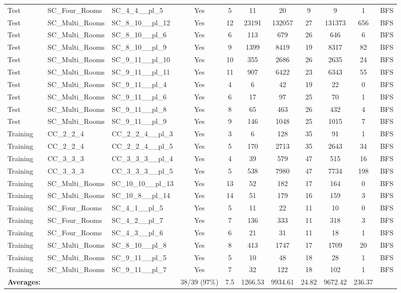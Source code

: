 \documentclass{article}
\begin{document}
\begin{tabular}{lllcccccccc}
Test & SC\_Four\_Rooms & SC\_4\_4\_\_pl\_5 & Yes & 5 & 11 & 20 & 9 & 9 & 1 & BFS \\
Test & SC\_Multi\_Rooms & SC\_8\_10\_\_pl\_12 & Yes & 12 & 23191 & 132057 & 27 & 131373 & 656 & BFS \\
Test & SC\_Multi\_Rooms & SC\_8\_10\_\_pl\_6 & Yes & 6 & 113 & 679 & 26 & 646 & 6 & BFS \\
Test & SC\_Multi\_Rooms & SC\_8\_10\_\_pl\_9 & Yes & 9 & 1399 & 8419 & 19 & 8317 & 82 & BFS \\
Test & SC\_Multi\_Rooms & SC\_9\_11\_\_pl\_10 & Yes & 10 & 355 & 2686 & 26 & 2635 & 24 & BFS \\
Test & SC\_Multi\_Rooms & SC\_9\_11\_\_pl\_11 & Yes & 11 & 907 & 6422 & 23 & 6343 & 55 & BFS \\
Test & SC\_Multi\_Rooms & SC\_9\_11\_\_pl\_4 & Yes & 4 & 6 & 42 & 19 & 22 & 0 & BFS \\
Test & SC\_Multi\_Rooms & SC\_9\_11\_\_pl\_6 & Yes & 6 & 17 & 97 & 25 & 70 & 1 & BFS \\
Test & SC\_Multi\_Rooms & SC\_9\_11\_\_pl\_8 & Yes & 8 & 65 & 463 & 26 & 432 & 4 & BFS \\
Test & SC\_Multi\_Rooms & SC\_9\_11\_\_pl\_9 & Yes & 9 & 146 & 1048 & 25 & 1015 & 7 & BFS \\
Training & CC\_2\_2\_4 & CC\_2\_2\_4\_\_pl\_3 & Yes & 3 & 6 & 128 & 35 & 91 & 1 & BFS \\
Training & CC\_2\_2\_4 & CC\_2\_2\_4\_\_pl\_5 & Yes & 5 & 170 & 2713 & 35 & 2643 & 34 & BFS \\
Training & CC\_3\_3\_3 & CC\_3\_3\_3\_\_pl\_4 & Yes & 4 & 39 & 579 & 47 & 515 & 16 & BFS \\
Training & CC\_3\_3\_3 & CC\_3\_3\_3\_\_pl\_5 & Yes & 5 & 538 & 7980 & 47 & 7734 & 198 & BFS \\
Training & SC\_Multi\_Rooms & SC\_10\_10\_\_pl\_13 & Yes & 13 & 52 & 182 & 17 & 164 & 0 & BFS \\
Training & SC\_Multi\_Rooms & SC\_10\_8\_\_pl\_14 & Yes & 14 & 51 & 179 & 16 & 159 & 3 & BFS \\
Training & SC\_Four\_Rooms & SC\_4\_1\_\_pl\_5 & Yes & 5 & 11 & 22 & 11 & 10 & 0 & BFS \\
Training & SC\_Four\_Rooms & SC\_4\_2\_\_pl\_7 & Yes & 7 & 136 & 333 & 11 & 318 & 3 & BFS \\
Training & SC\_Four\_Rooms & SC\_4\_3\_\_pl\_6 & Yes & 6 & 21 & 31 & 11 & 18 & 1 & BFS \\
Training & SC\_Multi\_Rooms & SC\_8\_10\_\_pl\_8 & Yes & 8 & 413 & 1747 & 17 & 1709 & 20 & BFS \\
Training & SC\_Multi\_Rooms & SC\_9\_11\_\_pl\_5 & Yes & 5 & 10 & 48 & 18 & 28 & 1 & BFS \\
Training & SC\_Multi\_Rooms & SC\_9\_11\_\_pl\_7 & Yes & 7 & 32 & 122 & 18 & 102 & 1 & BFS \\
\textbf{Averages:} & & & 38/39 (97\%) & 7.5 & 1266.53 & 9934.61 & 24.82 & 9672.42 & 236.37 & \\
\bottomrule
\end{tabular}
\newpage
\end{document}

